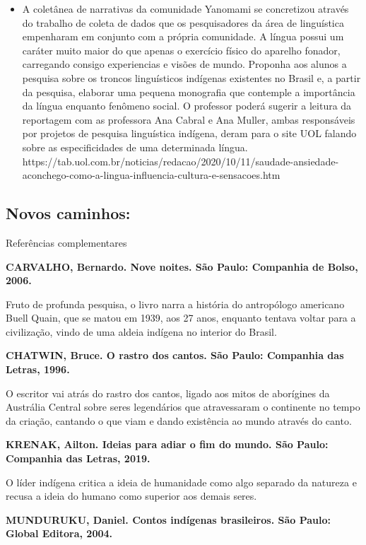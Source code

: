 \documentclass[12pt]{extarticle}
\begin{document}
\begin{itemize}
\item
  A coletânea de narrativas da comunidade Yanomami se concretizou
  através do trabalho de coleta de dados que os pesquisadores da área de
  linguística empenharam em conjunto com a própria comunidade. A língua
  possui um caráter muito maior do que apenas o exercício físico do
  aparelho fonador, carregando consigo experiencias e visões de mundo.
  Proponha aos alunos a pesquisa sobre os troncos linguísticos indígenas
  existentes no Brasil e, a partir da pesquisa, elaborar uma pequena
  monografia que contemple a importância da língua enquanto fenômeno
  social. O professor poderá sugerir a leitura da reportagem com as
  professora Ana Cabral e Ana Muller, ambas responsáveis por projetos de
  pesquisa linguística indígena, deram para o site UOL falando sobre as
  especificidades de uma determinada língua.
  https://tab.uol.com.br/noticias/redacao/2020/10/11/saudade-ansiedade-aconchego-como-a-lingua-influencia-cultura-e-sensacoes.htm\textbf{\\
  }
\end{itemize}

\subsection{Novos caminhos:} Referências complementares

\textbf{CARVALHO, Bernardo. Nove noites. São Paulo: Companhia de Bolso,
2006.}

Fruto de profunda pesquisa, o livro narra a história do antropólogo
americano Buell Quain, que se matou em 1939, aos 27 anos, enquanto
tentava voltar para a civilização, vindo de uma aldeia indígena no
interior do Brasil.

\textbf{CHATWIN, Bruce. O rastro dos cantos. São Paulo: Companhia das
Letras, 1996.}

O escritor vai atrás do rastro dos cantos, ligado aos mitos de
aborígines da Austrália Central sobre seres legendários que atravessaram
o continente no tempo da criação, cantando o que viam e dando existência
ao mundo através do canto.

\textbf{KRENAK, Ailton. Ideias para adiar o fim do mundo. São Paulo:
Companhia das Letras, 2019.}

O líder indígena critica a ideia de humanidade como algo separado da
natureza e recusa a ideia do humano como superior aos demais seres.

\textbf{MUNDURUKU, Daniel. Contos indígenas brasileiros. São Paulo:
Global Editora, 2004.}
\end{document}
